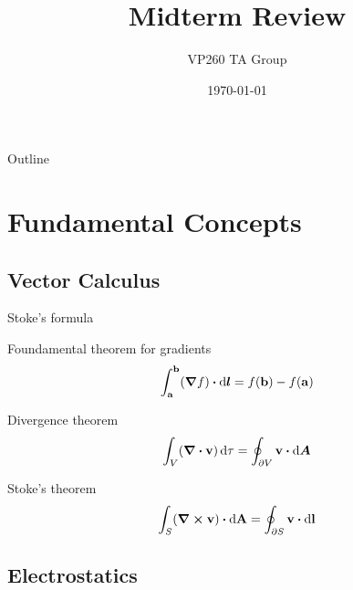 \documentclass{beamer}
\title[VP260 RC]{Midterm Review} %
\author{VP260 TA Group} %
\institute[UM-SJTU JI] %
{
    University of Michigan - Shanghai Jiao Tong University Joint Institute\\%
\medskip
}
\date{\today} %
\begin{document}
\begin{frame}
    \titlepage %
\end{frame}

\begin{frame}{Outline}
\tableofcontents
\end{frame}

\section{Fundamental Concepts}

\subsection{Vector Calculus} %

\begin{frame}{Stoke's formula}
	\begin{block}{Foundamental theorem for gradients}
		\begin{equation}
			\int_{\vb{a}}^{\vb{b}} (\grad f) \vdot \dd{\vb*{l}} = f(\vb{b}) - f(\vb{a})
		\end{equation}
	\end{block}
	
	\begin{block}{Divergence theorem}
		\begin{equation}
			\int_V (\div \vb{v}) \dd{\tau} = \oint_{\partial V} \vb{v} \vdot \dd{\vb*{A}}
		\end{equation}
	\end{block}

	\begin{block}{Stoke's theorem}
		\begin{equation}
			\int_S (\curl \vb{v}) \vdot \dd{\vb{A}} = \oint_{\partial S} \vb{v} \vdot \dd{\vb{l}}
		\end{equation}
	\end{block}
\end{frame}

\subsection{Electrostatics}
\end{document}
